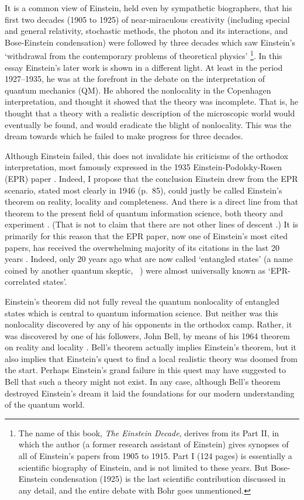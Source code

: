 \documentclass[12pt]{iopart}
\begin{document}
It is a common view of Einstein, held even by sympathetic biographers, that his first 
two decades (1905 to 1925) of near-miraculous creativity
(including special and general relativity, stochastic methods, the photon 
and its interactions, and Bose-Einstein condensation) 
were followed by three decades which saw Einstein's `withdrawal from the 
contemporary problems of theoretical physics' \cite{Lan74} \footnote{The name of this book, {\em The Einstein Decade}, derives from its Part II, in 
which the author (a former research assistant of Einstein) gives synopses of all of  
Einstein's papers from 1905 to 1915. 
Part I (124 pages) is  essentially a scientific biography of Einstein, and is not
limited to these years. But Bose-Einstein condensation (1925) 
is the last scientific contribution discussed in any detail, and the entire debate with Bohr goes unmentioned.}. In this essay Einstein's later work is shown in a different light. 
At least in the period 1927--1935, he was at the forefront in the debate on the 
interpretation of quantum mechanics (QM). He abhored the nonlocality
in the Copenhagen interpretation, and thought it showed that the theory was incomplete.
That is, he thought that a theory with a realistic description of 
the microscopic world would eventually be found, and would eradicate the blight of nonlocality. 
This was the dream towards which he  failed to make progress for three decades.

Although Einstein failed, this does  
not invalidate his criticisms of the orthodox interpretation, 
most famously expressed in the 1935 Einstein-Podolsky-Rosen (EPR) paper
\cite{EinPodRos35}. Indeed,  I propose that the conclusion Einstein drew from the EPR 
 scenario, stated most clearly in 1946 \cite{Ein46} (p.~85), 
 could justly be called Einstein's theorem on reality, locality and completeness. 
 And there is a direct line from that theorem to the present field of quantum information science,
both theory and experiment \cite{PleVed98}.  (That is not to claim that there are not other lines of descent \cite{NieChu00,SpiMunBarKok05}.) 
It is primarily for this reason that the EPR paper, now one of Einstein's most cited papers, has received the overwhelming majority of its citations in the last 20 years \cite{Red05}. 
Indeed, only 20 years ago what are now called `entangled states' 
(a name coined by another quantum skeptic, \sch\ \cite{Sch35}) were almost universally   
known as `EPR-correlated states'. 

Einstein's theorem did not fully reveal the quantum nonlocality of entangled states which 
is central to quantum information science. 
But neither was this nonlocality discovered  by any of his opponents in the orthodox camp. 
Rather,  it was discovered by one of his followers, 
 John Bell, by means of his 1964 theorem on reality and locality \cite{Bel64}. 
 Bell's theorem actually implies Einstein's theorem, 
 but it also implies that Einstein's 
 quest to find a local realistic theory was doomed from the start. Perhaps  Einstein's
 grand failure in this quest may have suggested to Bell that 
 such a theory might not exist. In any case, although Bell's theorem destroyed Einstein's dream  
it laid the foundations for our modern understanding of the quantum world. 
\end{document}
